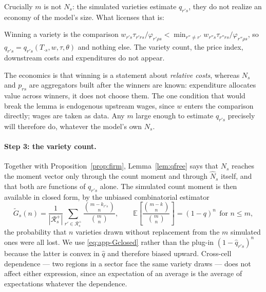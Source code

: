 Crucially $m$ is not $N_{s}$: the simulated varieties estimate $q_{r's}$, they do not realize an
economy of the model's size. What licenses that is:

\begin{lemma}[$q_{r's}$ is free of $N_{s}$]
\label{lem:qfree}
Winning a variety is the comparison
$w_{r's}\tau_{r'rs}/\varphi_{r'\rho s}<\min_{r''\neq r'}w_{r''s}\tau_{r''rs}/\varphi_{r''\rho s}$,
so $q_{r's}=q_{r's}(T_{\cdot s},w,\tau,\theta)$ and nothing else. The variety count, the price
index, downstream costs and expenditures do not appear.
\end{lemma}

The economics is that winning is a statement about \emph{relative costs}, whereas $N_{s}$ and
$p_{rs}$ are aggregators built after the winners are known: expenditure allocates value across
winners, it does not choose them. The one condition that would break the lemma is endogenous
upstream wages, since $w$ enters the comparison directly; wages are taken as data. Any $m$ large
enough to estimate $q_{r's}$ precisely will therefore do, whatever the model's own $N_{s}$.

\paragraph{Step 3: the variety count.} Together with Proposition~\ref{prop:firm},
Lemma~\ref{lem:qfree} says that $N_{s}$ reaches the moment vector only through the count moment
and through $\widehat N_{s}$ itself, and that both are functions of $q_{r's}$ alone. The
simulated count moment is then available in closed form, by the unbiased combinatorial estimator
\begin{equation}
\tilde G_{s}(n)=\frac{1}{|\mathcal{R}^{+}_{s}|}\sum_{r'\in\mathcal{R}^{+}_{s}}
\frac{\binom{m-k_{r's}}{n}}{\binom{m}{n}},
\qquad
\mathbb{E}\left[\frac{\binom{m-k}{n}}{\binom{m}{n}}\right]=(1-q)^{n}\ \ \text{for } n\le m,
\label{eq:app-Gclosed}
\end{equation}
the probability that $n$ varieties drawn without replacement from the $m$ simulated ones were all
lost. We use \eqref{eq:app-Gclosed} rather than the plug-in $(1-\hat q_{r's})^{n}$ because the
latter is convex in $\hat q$ and therefore biased upward. Cross-cell dependence --- two regions
in a sector face the same variety draws --- does not affect either expression, since an
expectation of an average is the average of expectations whatever the dependence.

